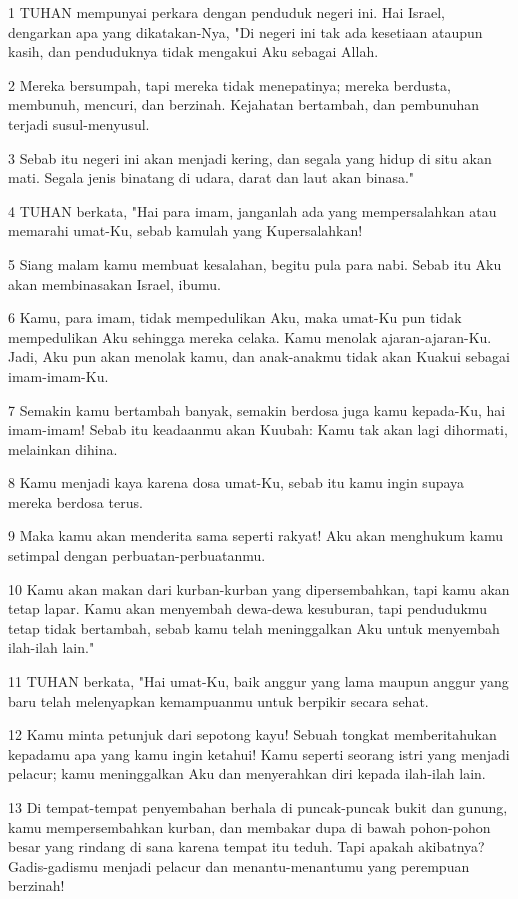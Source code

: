 \par 1 TUHAN mempunyai perkara dengan penduduk negeri ini. Hai Israel, dengarkan apa yang dikatakan-Nya, "Di negeri ini tak ada kesetiaan ataupun kasih, dan penduduknya tidak mengakui Aku sebagai Allah.
\par 2 Mereka bersumpah, tapi mereka tidak menepatinya; mereka berdusta, membunuh, mencuri, dan berzinah. Kejahatan bertambah, dan pembunuhan terjadi susul-menyusul.
\par 3 Sebab itu negeri ini akan menjadi kering, dan segala yang hidup di situ akan mati. Segala jenis binatang di udara, darat dan laut akan binasa."
\par 4 TUHAN berkata, "Hai para imam, janganlah ada yang mempersalahkan atau memarahi umat-Ku, sebab kamulah yang Kupersalahkan!
\par 5 Siang malam kamu membuat kesalahan, begitu pula para nabi. Sebab itu Aku akan membinasakan Israel, ibumu.
\par 6 Kamu, para imam, tidak mempedulikan Aku, maka umat-Ku pun tidak mempedulikan Aku sehingga mereka celaka. Kamu menolak ajaran-ajaran-Ku. Jadi, Aku pun akan menolak kamu, dan anak-anakmu tidak akan Kuakui sebagai imam-imam-Ku.
\par 7 Semakin kamu bertambah banyak, semakin berdosa juga kamu kepada-Ku, hai imam-imam! Sebab itu keadaanmu akan Kuubah: Kamu tak akan lagi dihormati, melainkan dihina.
\par 8 Kamu menjadi kaya karena dosa umat-Ku, sebab itu kamu ingin supaya mereka berdosa terus.
\par 9 Maka kamu akan menderita sama seperti rakyat! Aku akan menghukum kamu setimpal dengan perbuatan-perbuatanmu.
\par 10 Kamu akan makan dari kurban-kurban yang dipersembahkan, tapi kamu akan tetap lapar. Kamu akan menyembah dewa-dewa kesuburan, tapi pendudukmu tetap tidak bertambah, sebab kamu telah meninggalkan Aku untuk menyembah ilah-ilah lain."
\par 11 TUHAN berkata, "Hai umat-Ku, baik anggur yang lama maupun anggur yang baru telah melenyapkan kemampuanmu untuk berpikir secara sehat.
\par 12 Kamu minta petunjuk dari sepotong kayu! Sebuah tongkat memberitahukan kepadamu apa yang kamu ingin ketahui! Kamu seperti seorang istri yang menjadi pelacur; kamu meninggalkan Aku dan menyerahkan diri kepada ilah-ilah lain.
\par 13 Di tempat-tempat penyembahan berhala di puncak-puncak bukit dan gunung, kamu mempersembahkan kurban, dan membakar dupa di bawah pohon-pohon besar yang rindang di sana karena tempat itu teduh. Tapi apakah akibatnya? Gadis-gadismu menjadi pelacur dan menantu-menantumu yang perempuan berzinah!
